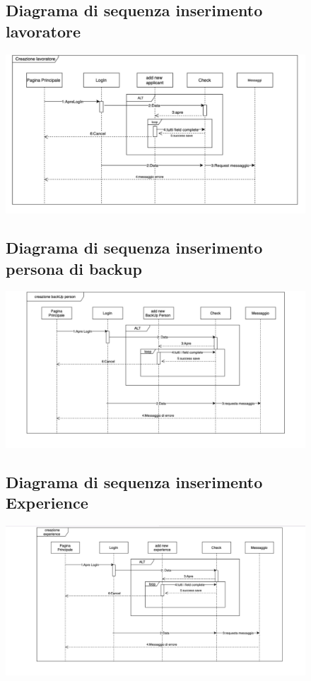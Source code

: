 \documentclass[ 4paper,11pt,openany]{book}
\begin{document}
\begin{figure}[htpb!] 
	\subsection{Diagrama di sequenza inserimento lavoratore}
	\includegraphics[width=180mm]{creazione_Lavoratore.jpeg}
\end{figure}
\begin{figure}[htpb!] 
	\subsection{Diagrama di sequenza inserimento persona di backup}
	\includegraphics[width=180mm]{creazione_Backup.jpeg}
\end{figure}
\begin{figure}[htpb!] 
	\subsection{Diagrama di sequenza inserimento Experience}
	\includegraphics[width=180mm]{creazione_Experience.jpeg}
\end{figure}
\end{document}
